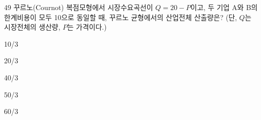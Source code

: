 \begin{question}{49}
꾸르노(Cournot) 복점모형에서 시장수요곡선이 $Q = 20 - P$이고, 두 기업 A와 B의 한계비용이 모두 10으로 동일할 때, 꾸르노 균형에서의 산업전체 산출량은? (단, $Q$는 시장전체의 생산량, $P$는 가격이다.)
\begin{choices}
  \item 10/3
  \item 20/3
  \item 40/3
  \item 50/3
  \item 60/3
\end{choices}
\end{question}
